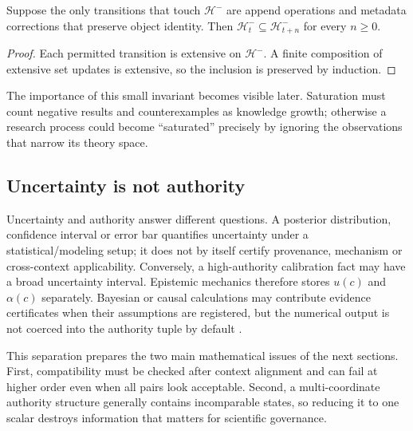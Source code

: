 \begin{proposition}
Suppose the only transitions that touch \(\mathcal H^{-}\) are append operations and metadata corrections that preserve object identity. Then \(\mathcal H_t^{-}\subseteq\mathcal H_{t+n}^{-}\) for every \(n\ge 0\).
\end{proposition}

\begin{proof}
Each permitted transition is extensive on \(\mathcal H^{-}\). A finite composition of extensive set updates is extensive, so the inclusion is preserved by induction.
\end{proof}

The importance of this small invariant becomes visible later. Saturation must count negative results and counterexamples as knowledge growth; otherwise a research process could become ``saturated'' precisely by ignoring the observations that narrow its theory space.

\subsection{Uncertainty is not authority}

Uncertainty and authority answer different questions. A posterior distribution, confidence interval or error bar quantifies uncertainty under a statistical/modeling setup; it does not by itself certify provenance, mechanism or cross-context applicability. Conversely, a high-authority calibration fact may have a broad uncertainty interval. Epistemic mechanics therefore stores \(u(c)\) and \(\alpha(c)\) separately. Bayesian or causal calculations may contribute evidence certificates when their assumptions are registered, but the numerical output is not coerced into the authority tuple by default \cite{pearl2009}.

This separation prepares the two main mathematical issues of the next sections. First, compatibility must be checked after context alignment and can fail at higher order even when all pairs look acceptable. Second, a multi-coordinate authority structure generally contains incomparable states, so reducing it to one scalar destroys information that matters for scientific governance.
